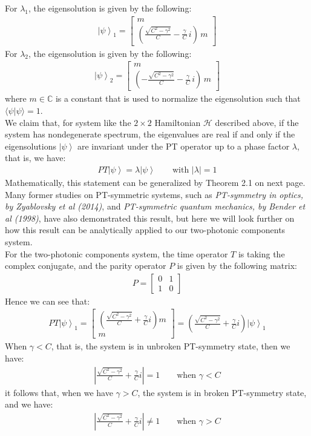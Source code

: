 \documentclass[1pt]{book}
\theoremstyle{break}
\theoremstyle{break}
\newcommand{\Complex}{\mathbb{C}}
\newcommand{\bmat}[1]{\begin{bmatrix} #1 \end{bmatrix}}
\begin{document}
For $\lambda_1$, the eigensolution is given by the following:
\begin{align*}
\left|\psi\right>_1 = \bmat{m \\  \left( \frac{\sqrt{C^2 - \gamma^2}}{C}-\frac{\gamma}{C}\, i\right)\, m }
\end{align*}
For $\lambda_2$, the eigensolution is given by the following:
\begin{align*}
\left|\psi\right>_2 = \bmat{m \\  \left(- \frac{\sqrt{C^2 - \gamma^2}}{C}-\frac{\gamma}{C} \, i \right)\, m}
\end{align*}
where $m\in \Complex$ is a constant that is used to normalize the eigensolution such that $\langle\psi |\psi\rangle = 1$. \\

We claim that, for system like the $2\times 2$ Hamiltonian 
$\mathcal{H}$ described above, if the system has nondegenerate spectrum,  the eigenvalues are real if and only if the eigensolutions $ \left|\psi\right>$ are invariant under the PT operator up to a phase factor $\lambda$, that is, we have:
\begin{align*}
PT \left|\psi\right> = \lambda \left|\psi\right> \qquad \text{with }|\lambda | =1  \tag{in unbroken PT-symmetric phase}
\end{align*}
Mathematically, this statement can be generalized by Theorem 2.1 on next page. Many former studies on PT-symmetric systems, such as \textit{PT-symmetry in optics, by Zyablovsky et al (2014)}, and \textit{PT-symmetric quantum mechanics, by Bender et al (1998)}, have also demonstrated this result, but here we will look further on how this result can be analytically applied to our two-photonic components system.\\

For the two-photonic components system, the time operator $T$ is taking the complex conjugate, and the parity operator $P$ is given by the following matrix:
\begin{align*}
P = \bmat{0 & 1 \\ 1 & 0}
\end{align*}
Hence we can see that:
\begin{align*}
PT \left|\psi\right>_1 = \bmat{\left(\frac{\sqrt{C^2 - \gamma^2}}{C}+\frac{\gamma}{C}i\right)m \\ m} = \left(\frac{\sqrt{C^2 - \gamma^2}}{C}+\frac{\gamma}{C}i\right) \left|\psi\right>_1
\end{align*}
When $\gamma< C$, that is, the system is in unbroken PT-symmetry state, then we have:
\begin{align*}
\left| \frac{\sqrt{C^2 - \gamma^2}}{C}+\frac{\gamma}{C}i \right| = 1 \qquad \text{when }\gamma<C
\end{align*}
it follows that, when we have $\gamma > C$, the system is in broken PT-symmetry state, and we have:
\begin{align*}
\left| \frac{\sqrt{C^2 - \gamma^2}}{C}+\frac{\gamma}{C}i \right| \neq 1 \qquad \text{when }\gamma > C
\end{align*}
\end{document}
